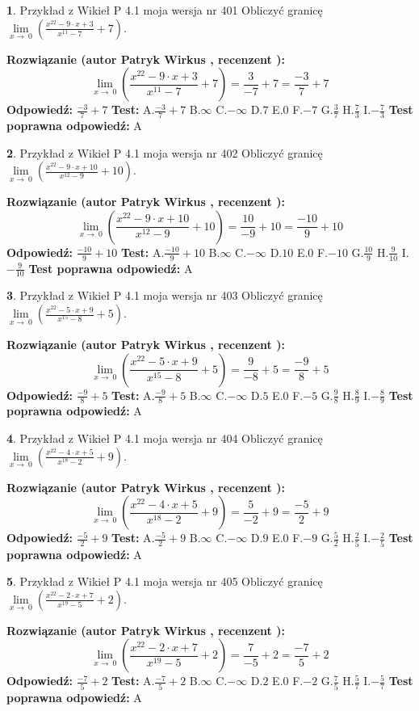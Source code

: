 \documentclass[12pt, a4paper]{article}
\theoremstyle{definition} %
\newtheorem{zad}{}
\newcommand{\zadStart}[1]{\begin{zad}#1\newline}
\newcommand{\zadStop}{\end{zad}}
\newcommand{\rozwStart}[2]{\noindent \textbf{Rozwiązanie (autor #1 , recenzent #2): }\newline}
\newcommand{\rozwStop}{\newline}
\newcommand{\odpStart}{\noindent \textbf{Odpowiedź:}\newline}
\newcommand{\odpStop}{\newline}
\newcommand{\testStart}{\noindent \textbf{Test:}\newline}
\newcommand{\testStop}{\newline}
\newcommand{\kluczStart}{\noindent \textbf{Test poprawna odpowiedź:}\newline}
\newcommand{\kluczStop}{\newline}
\begin{document}
\zadStart{Przykład z Wikieł P 4.1 moja wersja nr 401}
Obliczyć granicę $\lim\limits_{x\to\ 0}(\frac{x^{22}-9 \cdot x +3}{x^{11}-7}+7)$.
\zadStop
\rozwStart{Patryk Wirkus}{}
$$\lim\limits_{x\to\ 0}(\frac{x^{22}-9 \cdot x +3}{x^{11}-7}+7)=\frac{3}{-7}+7=\frac{-3}{7}+7$$
\rozwStop
\odpStart
$\frac{-3}{7}+7$
\odpStop
\testStart
A.$\frac{-3}{7}+7$
B.$\infty$
C.$-\infty$
D.$7$
E.$0$
F.$-7$
G.$\frac{3}{7}$
H.$\frac{7}{3}$
I.$-\frac{7}{3}$
\testStop
\kluczStart
A
\kluczStop



\zadStart{Przykład z Wikieł P 4.1 moja wersja nr 402}
Obliczyć granicę $\lim\limits_{x\to\ 0}(\frac{x^{22}-9 \cdot x +10}{x^{12}-9}+10)$.
\zadStop
\rozwStart{Patryk Wirkus}{}
$$\lim\limits_{x\to\ 0}(\frac{x^{22}-9 \cdot x +10}{x^{12}-9}+10)=\frac{10}{-9}+10=\frac{-10}{9}+10$$
\rozwStop
\odpStart
$\frac{-10}{9}+10$
\odpStop
\testStart
A.$\frac{-10}{9}+10$
B.$\infty$
C.$-\infty$
D.$10$
E.$0$
F.$-10$
G.$\frac{10}{9}$
H.$\frac{9}{10}$
I.$-\frac{9}{10}$
\testStop
\kluczStart
A
\kluczStop



\zadStart{Przykład z Wikieł P 4.1 moja wersja nr 403}
Obliczyć granicę $\lim\limits_{x\to\ 0}(\frac{x^{22}-5 \cdot x +9}{x^{15}-8}+5)$.
\zadStop
\rozwStart{Patryk Wirkus}{}
$$\lim\limits_{x\to\ 0}(\frac{x^{22}-5 \cdot x +9}{x^{15}-8}+5)=\frac{9}{-8}+5=\frac{-9}{8}+5$$
\rozwStop
\odpStart
$\frac{-9}{8}+5$
\odpStop
\testStart
A.$\frac{-9}{8}+5$
B.$\infty$
C.$-\infty$
D.$5$
E.$0$
F.$-5$
G.$\frac{9}{8}$
H.$\frac{8}{9}$
I.$-\frac{8}{9}$
\testStop
\kluczStart
A
\kluczStop



\zadStart{Przykład z Wikieł P 4.1 moja wersja nr 404}
Obliczyć granicę $\lim\limits_{x\to\ 0}(\frac{x^{22}-4 \cdot x +5}{x^{18}-2}+9)$.
\zadStop
\rozwStart{Patryk Wirkus}{}
$$\lim\limits_{x\to\ 0}(\frac{x^{22}-4 \cdot x +5}{x^{18}-2}+9)=\frac{5}{-2}+9=\frac{-5}{2}+9$$
\rozwStop
\odpStart
$\frac{-5}{2}+9$
\odpStop
\testStart
A.$\frac{-5}{2}+9$
B.$\infty$
C.$-\infty$
D.$9$
E.$0$
F.$-9$
G.$\frac{5}{2}$
H.$\frac{2}{5}$
I.$-\frac{2}{5}$
\testStop
\kluczStart
A
\kluczStop



\zadStart{Przykład z Wikieł P 4.1 moja wersja nr 405}
Obliczyć granicę $\lim\limits_{x\to\ 0}(\frac{x^{22}-2 \cdot x +7}{x^{19}-5}+2)$.
\zadStop
\rozwStart{Patryk Wirkus}{}
$$\lim\limits_{x\to\ 0}(\frac{x^{22}-2 \cdot x +7}{x^{19}-5}+2)=\frac{7}{-5}+2=\frac{-7}{5}+2$$
\rozwStop
\odpStart
$\frac{-7}{5}+2$
\odpStop
\testStart
A.$\frac{-7}{5}+2$
B.$\infty$
C.$-\infty$
D.$2$
E.$0$
F.$-2$
G.$\frac{7}{5}$
H.$\frac{5}{7}$
I.$-\frac{5}{7}$
\testStop
\kluczStart
A
\kluczStop
\end{document}
